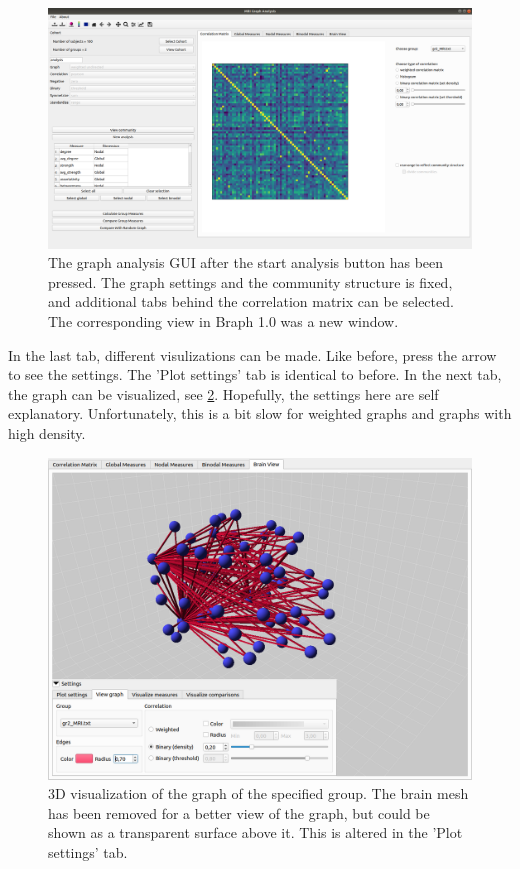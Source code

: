 \documentclass{article}
\begin{document}
\begin{figure}[H]
    \centering
    \includegraphics[width=0.9\linewidth]{start_analysis.png}
    \caption{The graph analysis GUI after the start analysis button has been pressed. The graph settings and the community structure is fixed, and additional tabs behind the correlation matrix can be selected. The corresponding view in Braph 1.0 was a new window.}
    \label{fig:start_analysis}
\end{figure}

In the last tab, different visulizations can be made. Like before, press the arrow to see the settings. The 'Plot settings' tab is identical to before. In the next tab, the graph can be visualized, see \cref{fig:graph_vis}. Hopefully, the settings here are self explanatory. Unfortunately, this is a bit slow for weighted graphs and graphs with high density.

\begin{figure}[H]
    \centering
    \includegraphics[width=0.65\linewidth]{graph_vis.png}
    \caption{3D visualization of the graph of the specified group. The brain mesh has been removed for a better view of the graph, but could be shown as a transparent surface above it. This is altered in the 'Plot settings' tab.}
    \label{fig:graph_vis}
\end{figure}
\end{document}
